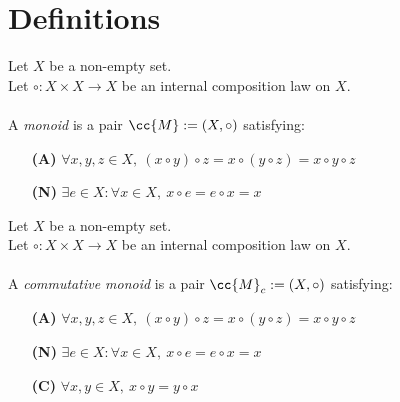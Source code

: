 \newpage

\section{Definitions}

\begin{definition-pre}[Monoid]
    \label{def:monoid}
    Let $X$ be a non-empty set.\\
    Let $\circ: X\times X \to X$ be an internal composition law on $X$. \\\\
    A \textit{monoid} is a pair $\cc{M}:= (X, \circ)$ satisfying:
    \begin{enumerate}
        \item [\textbf{(A)}] $\forall x,y,z\in X,\ (x\circ y)\circ z= x\circ (y\circ z) = x\circ y \circ z$
        \item [\textbf{(N)}] $\exists e \in X : \forall x \in X,\ x\circ e = e \circ x = x$
    \end{enumerate}
\end{definition-pre}

\begin{definition-pre}
    \label{def:commutative_monoid}
    Let $X$ be a non-empty set.\\
    Let $\circ: X\times X \to X$ be an internal composition law on $X$. \\\\
    A \textit{commutative monoid} is a pair $\cc{M}_c:= (X, \circ)$ satisfying:
    \begin{enumerate}
        \item [\textbf{(A)}] $\forall x,y,z\in X,\ (x\circ y)\circ z= x\circ (y\circ z) = x\circ y \circ z$
        \item [\textbf{(N)}] $\exists e \in X : \forall x \in X,\ x\circ e = e \circ x = x$
        \item [\textbf{(C)}] $\forall x,y\in X,\ x\circ y = y\circ x$
    \end{enumerate}
\end{definition-pre}


